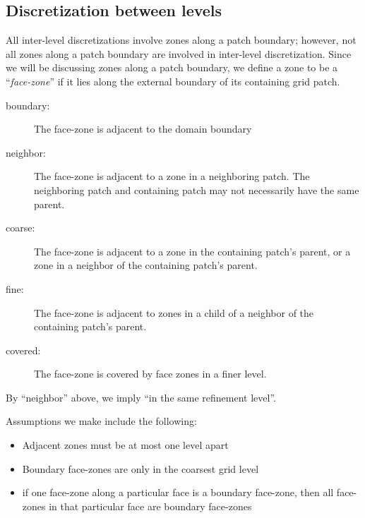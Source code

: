 \documentclass[10pt]{article}
\begin{document}
\subsection{Discretization between levels} \label{ss:discret-between-levels}

All inter-level discretizations involve zones along a patch boundary;
however, not all zones along a patch boundary are involved in
inter-level discretization.  Since we will be discussing zones along a
patch boundary, we define a zone to be a ``\textit{face-zone}'' if it
lies along the external boundary of its containing grid patch.

\begin{center}
\begin{minipage}{4in}
\end{minipage}
\end{center}

\begin{description}
\item[boundary: ] The face-zone is adjacent to the domain boundary
\item[neighbor: ] The face-zone is adjacent to a zone in a neighboring patch.  The neighboring patch and containing patch may not necessarily have the same parent.
\item[coarse: ] The face-zone is adjacent to a zone in the containing patch's parent, or
a zone in a neighbor of the containing patch's parent.
\item[fine: ] The face-zone is adjacent to zones in a child of a neighbor of the containing patch's parent.
\item[covered: ] The face-zone is covered by face zones in a finer level.
\end{description}

By ``neighbor'' above, we imply ``in the same refinement level''.

Assumptions we make include the following:

\begin{itemize}
\item Adjacent zones must be at
most one level apart
\item Boundary face-zones are only
in the coarsest grid level
\item if one
face-zone along a particular face is a boundary face-zone, then
all face-zones in that particular face are boundary face-zones
\end{itemize}
\end{document}
